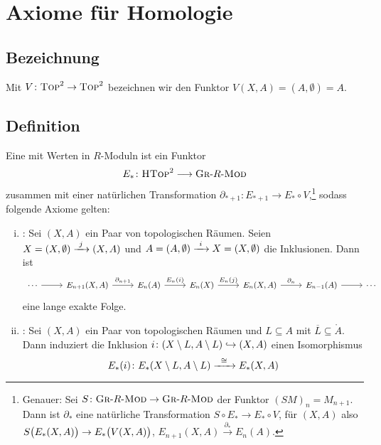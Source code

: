 \section{Axiome für Homologie} %
\label{sec:14}
\subsection[Bezeichnung: Funktor mit $(X,A) \mapsto (X,\emptyset)$]{Bezeichnung} %
\label{sub:141}
Mit $V \colon \TOP^2 \to \TOP^2$ bezeichnen wir den Funktor $V(X,A) = (A,\emptyset)=A$.

\subsection[Definition: Homologietheorie]{Definition} %
\label{sub:142}
Eine  mit Werten in $R$-Moduln ist ein Funktor 
\[
	E_* \colon \HTOP^2 \longrightarrow \textsc{Gr}\text{-}R\text{-}\MOD
\]
zusammen mit einer natürlichen Transformation $\partial_{*+1} \colon E_{*+1}  \to E_{*} \circ V$,\footnote{Genauer: Sei 
$S \colon \textsc{Gr}\text{-}R\text{-}\MOD \to \textsc{Gr}\text{-}R\text{-}\MOD$ der Funktor $(S M)_n = M_{n+1}$. Dann ist $\partial_*$ eine natürliche Transformation
$S \circ E_* \to E_* \circ V$, für $(X,A)$ also 
$S \enbrace[\big]{E_*(X,A)} \to E_* \enbrace[\big]{V(X,A)}$, $E_{n+1}(X,A) \xrightarrow{\partial_*}E_n(A)$.}  sodass folgende Axiome gelten:
\begin{enumerate}[(i)]
	\item {}: Sei $(X,A)$ ein Paar von topologischen Räumen. Seien $X= (X,\emptyset) \xrightarrow{\minwidthbox{j}{1em}} (X,A)$ und 
	$A= (A,\emptyset) \xrightarrow{\minwidthbox{i}{1em}} X=(X,\emptyset)$ die Inklusionen. Dann ist 
	\[
		\begin{tikzcd}[font=\small]
			\cdots \rar & E_{n+1}(X,A) \rar["\partial_{n+1}"] & E_n(A) \rar["E_n(i)"] & E_n(X) \rar["E_n(j)"] & E_n(X,A) \rar["\partial_{n}"] & E_{n-1}(A) \rar & \cdots
		\end{tikzcd}
	\] 
	eine lange exakte Folge.
	\item {}: Sei $(X,A)$ ein Paar von topologischen Räumen und $L \subseteq A$ mit $\overline{L} \subseteq \mathring{A}$. Dann induziert die Inklusion
	$i \colon \enbrace*{X \setminus L, A \setminus L} \hookrightarrow (X,A)$ einen Isomorphismus
	\[
		E_*(i) \colon E_* \enbrace*{X \setminus L, A \setminus L} \xrightarrow{\enspace \cong \enspace} E_*(X,A)  
	\] 
\end{enumerate}

